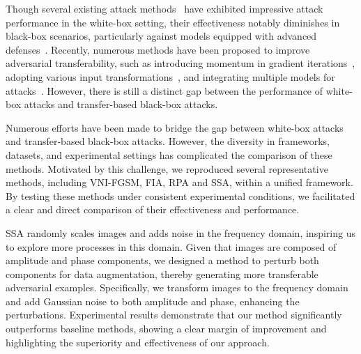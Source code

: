 Though several existing attack methods~\cite{kurakin2017adversarial,madry2018towards} have exhibited impressive attack performance in the white-box setting, their effectiveness notably diminishes in black-box scenarios, particularly against models equipped with advanced defenses~\cite{kurakin2017adversarialb, kurakin2018ensemble}. Recently, numerous methods have been proposed to improve adversarial transferability, such as introducing momentum in gradient iterations~\cite{dong2018boosting, lin2020nesterov, wang2021enhancing, wang2021boosting, ge2023boosting}, adopting various input transformations~\cite{xie2019improving, wang2021admix, yuan2022adaptive, wang2023structure, wang2023boosting}, and integrating multiple models for attacks~\cite{liu2017delving,chen2023rethinking}. However, there is still a distinct gap between the performance of white-box attacks and transfer-based black-box attacks.

Numerous efforts have been made to bridge the gap between white-box attacks and transfer-based black-box attacks. However, the diversity in frameworks, datasets, and experimental settings has complicated the comparison of these methods. Motivated by this challenge, we reproduced several representative methods, including VNI-FGSM, FIA, RPA and SSA, within a unified framework. By testing these methods under consistent experimental conditions, we facilitated a clear and direct comparison of their effectiveness and performance.

SSA randomly scales images and adds noise in the frequency domain, inspiring us to explore more processes in this domain. Given that images are composed of amplitude and phase components, we designed a method to perturb both components for data augmentation, thereby generating more transferable adversarial examples. Specifically, we transform images to the frequency domain and add Gaussian noise to both amplitude and phase, enhancing the perturbations. Experimental results demonstrate that our method significantly outperforms baseline methods, showing a clear margin of improvement and highlighting the superiority and effectiveness of our approach.






